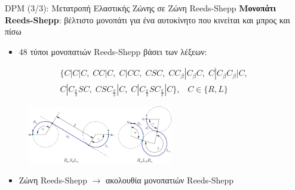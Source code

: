 \documentclass[10pt, compress, handout]{beamer} %
\begin{document}
\begin{frame}{DPM (3/3): Μετατροπή Ελαστικής Ζώνης σε Ζώνη Reeds-Shepp}
\textbf{Μονοπάτι Reeds-Shepp}: βέλτιστο μονοπάτι για ένα αυτοκίνητο που κινείται και μπρος και πίσω
	\begin{itemize}
		\item 48 τύποι μονοπατιών Reeds-Shepp βάσει των λέξεων:
	\end{itemize}
	\vspace{-0.4cm}
	\begin{align*}
		\{C|C|C,\;CC|C,\;C|CC,\;CSC,\;CC_{\beta}|C_{\beta}C,\;	C|C_{\beta}C_{\beta}|C,\;\nonumber\\C|C_{\frac{\pi}{2}}SC,\;CSC_{\frac{\pi}{2}}|C,\;C|C_{\frac{\pi}{2}}SC_{\frac{\pi}2}|C\},\;\;\; C \in \{R,L\}
	\end{align*}

	\vspace{-0.5cm}	
	\begin{figure}
		\includegraphics[height=2.5cm]{Figures/reeds_shepp_paths.png}
	\end{figure}

	\vspace{-0.2cm}	
	\begin{itemize}
		\item Ζώνη Reeds-Shepp $\rightarrow$ ακολουθία μονοπατιών Reeds-Shepp
	\end{itemize}
	
	\vspace{-0.5cm}
\end{frame}
\end{document}
